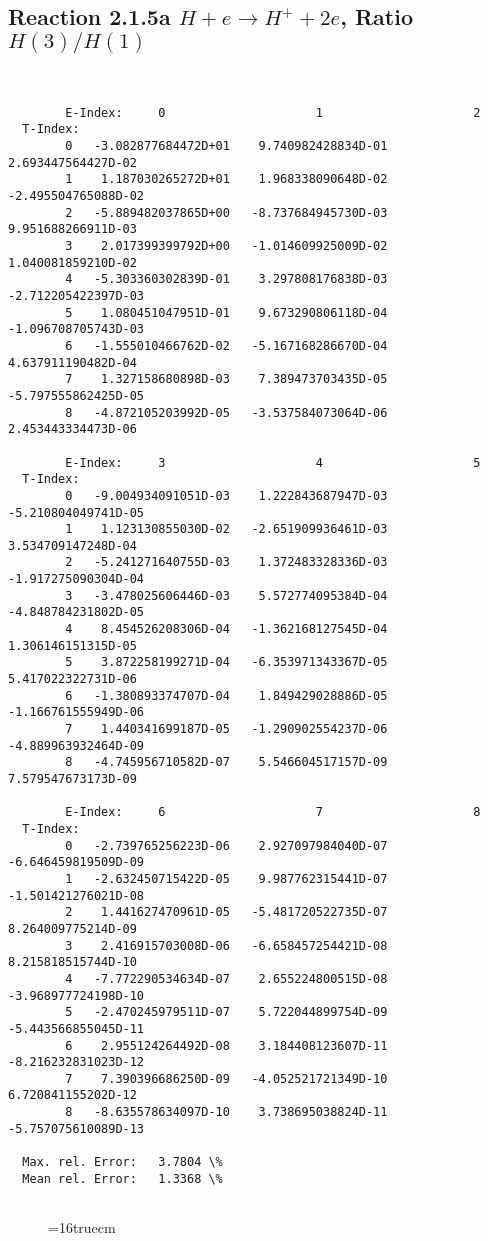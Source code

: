 \documentclass[12pt,dvipdfmx]{article}
\begin{document}
\subsection{
Reaction 2.1.5a  $H + e \rightarrow H^+ + 2e $, Ratio $H(3)/H(1)$
}

\begin{small}\begin{verbatim}


        E-Index:     0                     1                     2
  T-Index:
        0   -3.082877684472D+01    9.740982428834D-01    2.693447564427D-02
        1    1.187030265272D+01    1.968338090648D-02   -2.495504765088D-02
        2   -5.889482037865D+00   -8.737684945730D-03    9.951688266911D-03
        3    2.017399399792D+00   -1.014609925009D-02    1.040081859210D-02
        4   -5.303360302839D-01    3.297808176838D-03   -2.712205422397D-03
        5    1.080451047951D-01    9.673290806118D-04   -1.096708705743D-03
        6   -1.555010466762D-02   -5.167168286670D-04    4.637911190482D-04
        7    1.327158680898D-03    7.389473703435D-05   -5.797555862425D-05
        8   -4.872105203992D-05   -3.537584073064D-06    2.453443334473D-06

        E-Index:     3                     4                     5
  T-Index:
        0   -9.004934091051D-03    1.222843687947D-03   -5.210804049741D-05
        1    1.123130855030D-02   -2.651909936461D-03    3.534709147248D-04
        2   -5.241271640755D-03    1.372483328336D-03   -1.917275090304D-04
        3   -3.478025606446D-03    5.572774095384D-04   -4.848784231802D-05
        4    8.454526208306D-04   -1.362168127545D-04    1.306146151315D-05
        5    3.872258199271D-04   -6.353971343367D-05    5.417022322731D-06
        6   -1.380893374707D-04    1.849429028886D-05   -1.166761555949D-06
        7    1.440341699187D-05   -1.290902554237D-06   -4.889963932464D-09
        8   -4.745956710582D-07    5.546604517157D-09    7.579547673173D-09

        E-Index:     6                     7                     8
  T-Index:
        0   -2.739765256223D-06    2.927097984040D-07   -6.646459819509D-09
        1   -2.632450715422D-05    9.987762315441D-07   -1.501421276021D-08
        2    1.441627470961D-05   -5.481720522735D-07    8.264009775214D-09
        3    2.416915703008D-06   -6.658457254421D-08    8.215818515744D-10
        4   -7.772290534634D-07    2.655224800515D-08   -3.968977724198D-10
        5   -2.470245979511D-07    5.722044899754D-09   -5.443566855045D-11
        6    2.955124264492D-08    3.184408123607D-11   -8.216232831023D-12
        7    7.390396686250D-09   -4.052521721349D-10    6.720841155202D-12
        8   -8.635578634097D-10    3.738695038824D-11   -5.757075610089D-13

  Max. rel. Error:   3.7804 \%
  Mean rel. Error:   1.3368 \%


\end{verbatim}\end{small}
\begin{figure} \label{2.1.5a}
\epsfxsize=16truecm
\end{figure}
\end{document}
